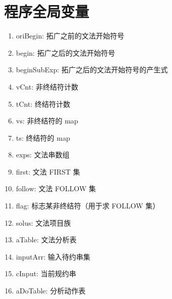 \documentclass[fontset=none,UTF8,a4paper,zihao=-4]{ctexart}
\begin{document}
\section{程序全局变量}
\label{sec:org2485ddc}
\begin{enumerate}
\item oriBegin:    拓广之前的文法开始符号
\item begin:       拓广之后的文法开始符号
\item beginSubExp: 拓广之后的文法开始符号的产生式
\item vCnt:        非终结符计数
\item tCnt:        终结符计数
\item vs:          非终结符的 map
\item ts:          终结符的 map
\item exps:        文法串数组
\item first:       文法 FIRST 集
\item follow:     文法 FOLLOW 集
\item flag:       标志某非终结符（用于求 FOLLOW 集）
\item solus:      文法项目族
\item aTable:     文法分析表
\item inputArr:   输入待约串集
\item cInput:     当前规约串
\item aDoTable:   分析动作表
\end{enumerate}
\end{document}
